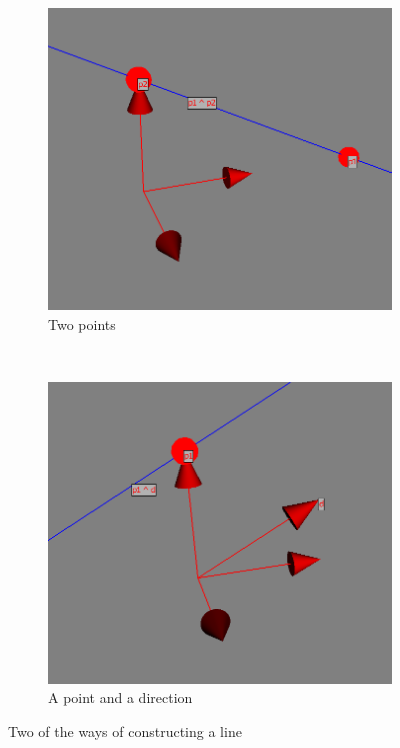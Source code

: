 \documentclass[a4paper, 10pt]{article}
\begin{document}
\begin{figure}
  \centering
  \begin{subfigure}[b]{0.5\textwidth}
    \centering
    \includegraphics[width=\textwidth]{./points.png}
    \caption{Two points}
    \label{fig:points}
  \end{subfigure}%
  ~ %
  \begin{subfigure}[b]{0.5\textwidth}
    \centering
    \includegraphics[width=\textwidth]{point_dir.png}
    \caption{A point and a direction}
    \label{fig:point_dir}
  \end{subfigure}
  \caption{Two of the ways of constructing a line}
  \label{fig:lines}
\end{figure}
\end{document}
